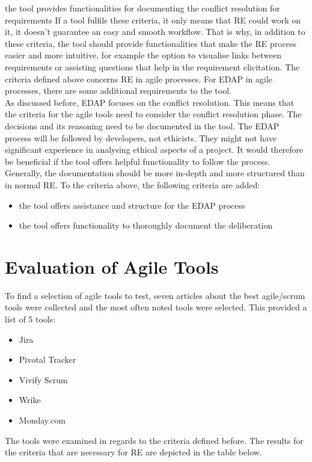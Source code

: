   the tool provides functionalities for documenting the conflict resolution for requirements
If a tool fulfils these criteria, it only means that RE could work on it, it doesn’t guarantee an easy and smooth workflow. That is why, in addition to these criteria, the tool should provide functionalities that make the RE process easier and more intuitive, for example the option to visualise links between requirements or assisting questions that help in the requirement elicitation. 
The criteria defined above concerns RE in agile processes. For EDAP in agile processes, there are some additional requirements to the tool.\\
As discussed before, EDAP focuses on the conflict resolution. This means that the criteria for the agile tools need to consider the conflict resolution phase. The decisions and its reasoning need to be documented in the tool. The EDAP process will be followed by developers, not ethicists. They might not have significant experience in analysing ethical aspects of a project. It would therefore be beneficial if the tool offers helpful functionality to follow the process. Generally, the documentation should be more in-depth and more structured than in normal RE.
To the criteria above, the following criteria are added:

\begin{itemize}
\item the tool offers assistance and structure for the EDAP process
\item the tool offers functionality to thoroughly document the deliberation
\end{itemize}

\section{Evaluation of Agile Tools}
To find a selection of agile tools to test, seven articles about the best agile/scrum tools were collected and the most often noted tools were selected. This provided a list of 5 tools:
\begin{itemize}
\item Jira
\item Pivotal Tracker
\item Vivify Scrum
\item Wrike
\item Monday.com
\end{itemize}
The tools were examined in regards to the criteria defined before. The results for the criteria that are necessary for RE are depicted in the table below. 

